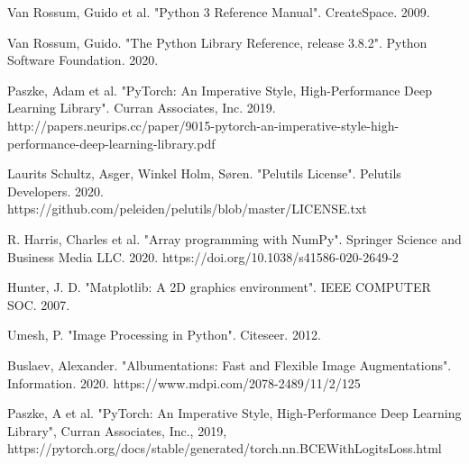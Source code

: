 \documentclass[12pt, fleqn, titlepage]{article}
\begin{document}
\newpage
\begin{thebibliography}{9} 
	
	
	
		
		 Van Rossum, Guido et al. "Python 3 Reference Manual". CreateSpace. 2009.
		
		 Van Rossum, Guido. "The Python Library Reference, release 3.8.2". Python Software Foundation. 2020.
		
		 Paszke, Adam et al. "PyTorch: An Imperative Style, High-Performance Deep Learning Library". Curran Associates, Inc. 2019. http://papers.neurips.cc/paper/9015-pytorch-an-imperative-style-high-performance-deep-learning-library.pdf
		
		 Laurits Schultz, Asger, Winkel Holm, Søren. "Pelutils License". Pelutils Developers. 2020. https://github.com/peleiden/pelutils/blob/master/LICENSE.txt
		
		 R. Harris, Charles et al. "Array programming with NumPy". Springer Science and Business Media LLC. 2020. https://doi.org/10.1038/s41586-020-2649-2
		
		 Hunter, J. D. "Matplotlib: A 2D graphics environment". IEEE COMPUTER SOC. 2007.
		
		 Umesh, P. "Image Processing in Python". Citeseer. 2012.
		
		 Buslaev, Alexander. "Albumentations: Fast and Flexible Image Augmentations". Information. 2020. https://www.mdpi.com/2078-2489/11/2/125
		
		 Paszke, A et al. "PyTorch: An Imperative Style, High-Performance Deep Learning Library", Curran Associates, Inc., 2019, https://pytorch.org/docs/stable/generated/torch.nn.BCEWithLogitsLoss.html
		

\end{thebibliography}
\end{document}
